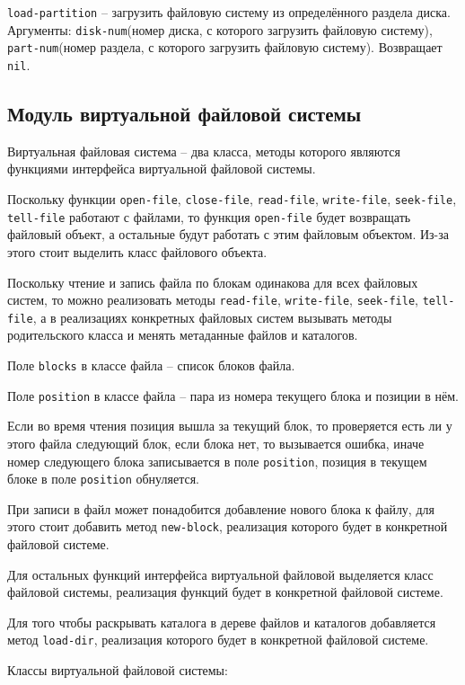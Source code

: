 \texttt{load-partition} -- загрузить файловую систему из определённого раздела диска. Аргументы: \texttt{disk-num}(номер диска, с которого загрузить файловую систему), \texttt{part-num}(номер раздела, с которого загрузить файловую систему). Возвращает \texttt{nil}.

\subsection{Модуль виртуальной файловой системы}

Виртуальная файловая система -- два класса, методы которого являются функциями интерфейса виртуальной файловой системы.

Поскольку функции \texttt{open-file}, \texttt{close-file}, \texttt{read-file}, \texttt{write-file}, \texttt{seek-file}, \texttt{tell-file} работают с файлами, то функция \texttt{open-file} будет возвращать файловый объект, а остальные будут работать с этим файловым объектом. Из-за этого стоит выделить класс файлового объекта.

Поскольку чтение и запись файла по блокам одинакова для всех файловых систем, то можно реализовать методы \texttt{read-file}, \texttt{write-file}, \texttt{seek-file}, \texttt{tell-file}, а в реализациях конкретных файловых систем вызывать методы родительского класса и менять метаданные файлов и каталогов.

Поле \texttt{blocks} в классе файла -- список блоков файла.

Поле \texttt{position} в классе файла -- пара из номера текущего блока и позиции в нём.

Если во время чтения позиция вышла за текущий блок, то проверяется есть ли у этого файла следующий блок, если блока нет, то вызывается ошибка, иначе номер следующего блока записывается в поле \texttt{position}, позиция в текущем блоке в поле \texttt{position} обнуляется.

При записи в файл может понадобится добавление нового блока к файлу, для этого стоит добавить метод \texttt{new-block}, реализация которого будет в конкретной файловой системе.

Для остальных функций интерфейса виртуальной файловой выделяется класс файловой системы, реализация функций будет в конкретной файловой системе.

Для того чтобы раскрывать каталога в дереве файлов и каталогов добавляется метод \texttt{load-dir}, реализация которого будет в конкретной файловой системе.

Классы виртуальной файловой системы:

